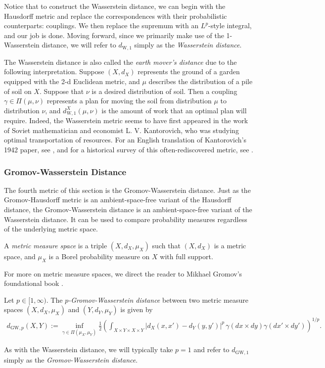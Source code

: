 \documentclass[twoside,11pt]{article}
\newcommand{\dWp}[1]{d_{\mathrm{W},#1}}
\newcommand{\dW}{\dWp 1}
\newcommand{\dGWp}[1]{d_{\mathrm{GW},#1}}
\begin{document}
Notice that to construct the Wasserstein distance, we can begin with the Hausdorff metric and replace the correspondences with their probabilistic counterparts: couplings. We then replace the supremum with an $L^p$-style integral, and our job is done. Moving forward, since we primarily make use of the 1-Wasserstein distance, we will refer to $\dW$ simply as the \emph{Wasserstein distance}.

The Wasserstein distance is also called the \emph{earth mover's distance} due to the following interpretation. Suppose $(X,d_X)$ represents the ground of a garden equipped with the 2-d Euclidean metric, and $\mu$ describes the distribution of a pile of soil on $X$. Suppose that $\nu$ is a desired distribution of soil. Then a coupling $\gamma \in \Pi(\mu,\nu)$ represents a plan for moving the soil from distribution $\mu$ to distribution $\nu$, and $\dW^X(\mu,\nu)$ is the amount of work that an optimal plan will require. Indeed, the Wasserstein metric seems to have first appeared in the work of Soviet mathematician and economist L. V. Kantorovich, who was studying optimal transportation of resources. For an English translation of Kantorovich's 1942 paper, see \citet{kantorovich_translocation_2006}, and for a historical survey of this often-rediscovered metric, see \citet{vershik_kantorovich_2006}.

\subsubsection{Gromov-Wasserstein Distance}
The fourth metric of this section is the Gromov-Wasserstein distance. Just as the Gromov-Hausdorff metric is an ambient-space-free variant of the Hausdorff distance, the Gromov-Wasserstein distance is an ambient-space-free variant of the Wasserstein distance. It can be used to compare probability measures regardless of the underlying metric space.
\begin{definition}
    A \emph{metric measure space} is a triple $(X,d_X,\mu_X)$ such that $(X,d_X)$ is a metric space, and $\mu_X$ is a Borel probability measure on $X$ with full support.
\end{definition}
For more on metric measure spaces, we direct the reader to Mikhael Gromov's foundational book \citep[Chapter 3$\frac12$]{gromov_convergence_2007}.


\begin{definition}\label{def:gw}
  Let $p \in [1,\infty)$. The \emph{$p$-Gromov-Wasserstein distance} between two metric measure spaces $(X,d_X,\mu_X)$ and $(Y,d_Y,\mu_Y)$ is given by
  \begin{align*}
    \dGWp{p}(X,Y) := \inf_{\gamma \in \Pi(\mu_X,\mu_Y)} \frac{1}{2}
    \left(\int_{X\times Y \times X \times Y}\big|d_X(x,x')-d_Y(y,y')\big|^p \, \gamma(dx\times dy)\gamma(dx'\times dy')\right)^{1/p}.
  \end{align*}
\end{definition}
As with the Wasserstein distance, we will typically take $p=1$ and refer to $\dGWp{1}$ simply as the \emph{Gromov-Wasserstein distance}.
\end{document}
